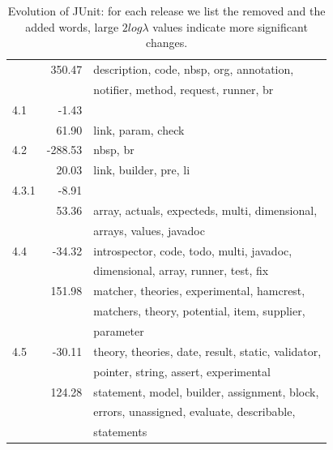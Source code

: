 \begin{table}
{\begin{center}
\begin{tabular}{lrl}
~ & 350.47 & description, code, nbsp, org, annotation,\\~&~& notifier, method, request, runner, br \\
\hline
4.1 & -1.43 &  \\
~ & 61.90 & link, param, check \\
\hline
4.2 & -288.53 & nbsp, br \\
~ & 20.03 & link, builder, pre, li \\
\hline
4.3.1 & -8.91 &  \\
~ & 53.36 & array, actuals, expecteds, multi, dimensional,\\~&~& arrays, values, javadoc \\
\hline
4.4 & -34.32 & introspector, code, todo, multi, javadoc,\\~&~& dimensional, array, runner, test, fix \\
~ & 151.98 & matcher, theories, experimental, hamcrest,\\~&~& matchers, theory, potential, item, supplier,\\~&~& parameter \\
\hline
4.5 & -30.11 & theory, theories, date, result, static, validator,\\~&~& pointer, string, assert, experimental \\
~ & 124.28 & statement, model, builder, assignment, block,\\~&~& errors, unassigned, evaluate, describable,\\~&~& statements \\
\end{tabular}
\end{center}}
\caption{Evolution of JUnit: for each release we list the removed and the added words, large $2log\lambda$ values indicate more significant changes.}
\label{tab:two}
\end{table}%



